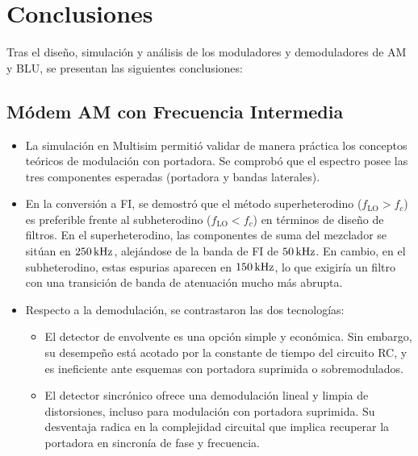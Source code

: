 \chapter{Conclusiones}
\label{sec:conclusiones}

Tras el diseño, simulación y análisis de los moduladores y demoduladores de AM y BLU, se presentan las siguientes
conclusiones:

\section{Módem AM con Frecuencia Intermedia}
\begin{itemize}
    \item La simulación en Multisim permitió validar de manera práctica los conceptos teóricos de modulación con
          portadora. Se comprobó que el espectro posee las tres componentes esperadas (portadora y bandas laterales).
    \item En la conversión a FI, se demostró que el método superheterodino ($f_{\text{LO}} > f_c$) es preferible frente al
          subheterodino ($f_{\text{LO}} < f_c$) en términos de diseño de filtros. En el superheterodino, las componentes
          de suma del mezclador se sitúan en $250\,\mathrm{kHz}$, alejándose de la banda de FI de $50\,\mathrm{kHz}$. En cambio, en el
          subheterodino, estas espurias aparecen en $150\,\mathrm{kHz}$, lo que exigiría un filtro con una transición de banda de
          atenuación mucho más abrupta.
    \item Respecto a la demodulación, se contrastaron las dos tecnologías:
        \begin{itemize}
            \item El detector de envolvente es una opción simple y económica. Sin embargo, su desempeño está acotado por la
                  constante de tiempo del circuito RC, y es ineficiente ante esquemas con portadora suprimida o sobremodulados.
            \item El detector sincrónico ofrece una demodulación lineal y limpia de distorsiones, incluso para modulación
                  con portadora suprimida. Su desventaja radica en la complejidad circuital que implica recuperar la portadora
                  en sincronía de fase y frecuencia.
        \end{itemize}
\end{itemize}

